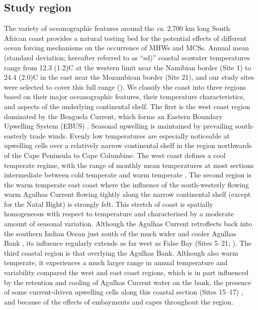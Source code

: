 \documentclass[a4paper,10pt,review]{elsarticle}
\begin{document}
\subsection{Study region}
The variety of oceanographic features around the \emph{ca}. 2,700 km long South African coast provides a natural testing bed for the potential effects of different ocean forcing mechanisms on the occurrence of MHWs and MCSs. Annual mean (standard deviation; hereafter referred to as ``sd)'' coastal seawater temperatures range from 12.3 (1.2)\degree C at the western limit near the Namibian border (Site 1) to 24.4 (2.0)\degree C in the east near the Mozambican border (Site 21), and our study sites were selected to cover this full range (). We classify the coast into three regions based on their major oceanographic features, their temperature characteristics, and aspects of the underlying continental shelf. The first is the west coast region dominated by the Benguela Current, which forms an Eastern Boundary Upwelling System (EBUS) \citep{Hutchings2009}. Seasonal upwelling is maintained by prevailing south-easterly trade winds. Evenly low temperatures are especially noticeable at upwelling cells over a relatively narrow continental shelf in the region northwards of the Cape Peninsula to Cape Columbine. The west coast defines a cool temperate regime, with the range of monthly mean temperatures at most sections intermediate between cold temperate and warm temperate \citep{Luning1990}. The second region is the warm temperate \citep{Luning1990} east coast where the influence of the south-westerly flowing warm Agulhas Current flowing tightly along the narrow continental shelf (except for the Natal Bight) is strongly felt. This stretch of coast is spatially homogeneous with respect to temperature and characterised by a moderate amount of seasonal variation. Although the Agulhas Current retroflects back into the southern Indian Ocean \citep{Hutchings2009} just south of the much wider and cooler Agulhas Bank \citep{Roberts2005}, its influence regularly extends as far west as False Bay (Sites 5--21; ). The third coastal region is that overlying the Agulhas Bank. Although also warm temperate, it experiences a much larger range in annual temperature and variability compared the west and east coast regions, which is in part influenced by the retention and cooling of Agulhas Current water on the bank, the presence of some current-driven upwelling cells along this coastal section (Sites 15--17) \citep{Roberts2005}, and because of the effects of embayments and capes throughout the region.
\end{document}
